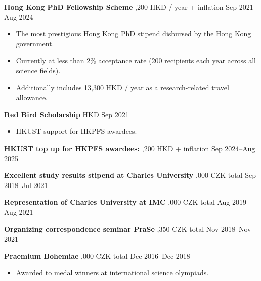 \textbf{Hong Kong PhD Fellowship Scheme} ,200 HKD / year + inflation \hfill Sep 2021--Aug 2024
\begin{itemize}
    \item The most prestigious Hong Kong PhD stipend disbursed by the Hong Kong government.
    \item Currently at less than 2\% acceptance rate (200 recipients each year across all science fields).
    \item Additionally includes 13,300 HKD / year as a research-related travel allowance.
\end{itemize} \par
\textbf{Red Bird Scholarship}  HKD \hfill Sep 2021
\begin{itemize}
    \item HKUST support for HKPFS awardees.
\end{itemize} \par
\textbf{HKUST top up for HKPFS awardees:} ,200 HKD + inflation \hfill Sep 2024--Aug 2025 \par
\textbf{Excellent study results stipend at Charles University} ,000 CZK total \hfill Sep 2018--Jul 2021 \par
\textbf{Representation of Charles University at IMC} ,000 CZK total \hfill Aug 2019--Aug 2021 \par
\textbf{Organizing correspondence seminar PraSe} ,350 CZK total \hfill Nov 2018--Nov 2021 \par
\textbf{Praemium Bohemiae} ,000 CZK total \hfill Dec 2016--Dec 2018
\begin{itemize}
    \item Awarded to medal winners at international science olympiads.
\end{itemize}
\fi